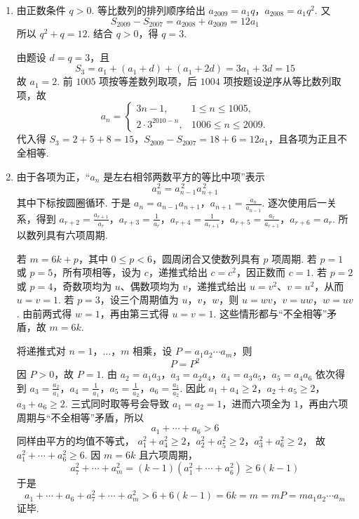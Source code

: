 \begin{solution}
\begin{enumerate}
\item 由正数条件 \(q>0\). 等比数列的排列顺序给出
\(a_{2009}=a_1q\)，\(a_{2008}=a_1q^2\).
又
\[
S_{2009}-S_{2007}=a_{2008}+a_{2009}=12a_1
\]
所以 \(q^2+q=12\). 结合 \(q>0\)，得 \(q=3\).

由题设 \(d=q=3\)，且
\[
S_3=a_1+(a_1+d)+(a_1+2d)=3a_1+3d=15
\]
故 \(a_1=2\). 前 \(1005\) 项按等差数列取项，后 \(1004\) 项按题设逆序从等比数列取项，故
\[
a_n=\begin{cases}
3n-1,&1\leqslant n\leqslant1005,\\
2\cdot3^{2010-n},&1006\leqslant n\leqslant2009.
\end{cases}
\]
代入得 \(S_3=2+5+8=15\)，\(S_{2009}-S_{2007}=18+6=12a_1\)，且各项为正且不全相等.

\item 由于各项为正，“\(a_n\) 是左右相邻两数平方的等比中项”表示
\[
a_n^2=a_{n-1}^{\,2}a_{n+1}^{\,2}
\]
其中下标按圆圈循环. 于是
\(a_n=a_{n-1}a_{n+1}\)，\(a_{n+1}=\frac{a_n}{a_{n-1}}\).
逐次使用后一关系，得到
\(a_{r+2}=\frac{a_{r+1}}{a_r}\)，\(a_{r+3}=\frac1{a_r}\)，\(a_{r+4}=\frac1{a_{r+1}}\)，\(a_{r+5}=\frac{a_r}{a_{r+1}}\)，\(a_{r+6}=a_r\).
所以数列具有六项周期.

若 \(m=6k+p\)，其中 \(0\leqslant p<6\)，圆周闭合又使数列具有 \(p\) 项周期. 若 \(p=1\) 或 \(p=5\)，所有项相等，设为 \(c\)，递推式给出 \(c=c^2\)，因正数而 \(c=1\). 若 \(p=2\) 或 \(p=4\)，奇数项均为 \(u\)、偶数项均为 \(v\)，递推式给出 \(u=v^2\)、\(v=u^2\)，从而 \(u=v=1\). 若 \(p=3\)，设三个周期值为 \(u\)，\(v\)，\(w\)，则
\(u=wv\)，\(v=uw\)，\(w=uv\).
由前两式得 \(w=1\)，再由第三式得 \(u=v=1\). 这些情形都与“不全相等”矛盾，故 \(m=6k\).

将递推式对 \(n=1\)，\(\ldots\)，\(m\) 相乘，设 \(P=a_1a_2\cdots a_m\)，则
\[
P=P^2
\]
因 \(P>0\)，故 \(P=1\). 由
\(a_2=a_1a_3\)，\(a_3=a_2a_4\)，\(a_4=a_3a_5\)，\(a_5=a_4a_6\)
依次得到
\(a_3=\frac{a_2}{a_1}\)，\(a_4=\frac1{a_1}\)，\(a_5=\frac1{a_2}\)，\(a_6=\frac{a_1}{a_2}\).
因此
\(a_1+a_4\geqslant2\)，\(a_2+a_5\geqslant2\)，\(a_3+a_6\geqslant2\).
三式同时取等号会导致 \(a_1=a_2=1\)，进而六项全为 \(1\)，再由六项周期与“不全相等”矛盾，所以
\[
a_1+\cdots+a_6>6
\]
同样由平方的均值不等式，
\(a_1^2+a_4^2\geqslant2\)，\(a_2^2+a_5^2\geqslant2\)，\(a_3^2+a_6^2\geqslant2\)，
故 \(a_1^2+\cdots+a_6^2\geqslant6\). 因 \(m=6k\) 且六项周期，
\[
a_7^2+\cdots+a_m^2=(k-1)(a_1^2+\cdots+a_6^2)\geqslant6(k-1)
\]
于是
\[
a_1+\cdots+a_6+a_7^2+\cdots+a_m^2
>6+6(k-1)=6k=m=mP=ma_1a_2\cdots a_m
\]
证毕.
\end{enumerate}
\end{solution}
